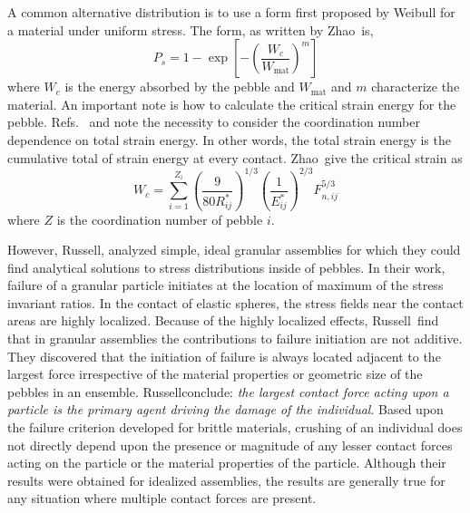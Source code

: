 A common alternative distribution is to use a form first proposed by Weibull for a material under uniform stress\cite{Kwok2013,Zhao2011,nakata1999probabilistic,Zhao2013,Pitchumani2004}. The form, as written by Zhao\etal~is,
\begin{equation}
	P_s = 1 - \exp\left[-\left(\frac{W_c}{W_\text{mat}}\right)^m\right]
\end{equation}
where $W_c$ is the energy absorbed by the pebble and $W_\text{mat}$ and $m$ characterize the material. An important note is how to calculate the critical strain energy for the pebble. Refs.~\cite{Marketos2007} and \cite{Zhao2011} note the necessity to consider the coordination number dependence on total strain energy. In other words, the total strain energy is the cumulative total of strain energy at every contact. Zhao\etal~give the critical strain as
\begin{equation}
	W_c = \sum_{i=1}^{Z_i}\left(\frac{9}{80 R_{ij}^*}\right)^{1/3} \left(\frac{1}{E_{ij}^*}\right)^{2/3} F_{n,ij}^{5/3}
\end{equation}
where $Z$ is the coordination number of pebble $i$. 

However, Russell\etal, analyzed simple, ideal granular assemblies for which they could find analytical solutions to stress distributions inside of pebbles.\cite{Russell2009} In their work, failure of a granular particle initiates at the location of maximum of the stress invariant ratios. In the contact of elastic spheres, the stress fields near the contact areas are highly localized. Because of the highly localized effects, Russell\etal~find that in granular assemblies the contributions to failure initiation are not additive. They discovered that the initiation of failure is always located adjacent to the largest force irrespective of the material properties or geometric size of the pebbles in an ensemble. Russell\etal conclude: \emph{the largest contact force acting upon a particle is the primary agent driving the damage of the individual}.\cite{Russell2009} Based upon the failure criterion developed for brittle materials, crushing of an individual does not directly depend upon the presence or magnitude of any lesser contact forces acting on the particle or the material properties of the particle. Although their results were obtained for idealized assemblies, the results are generally true for any situation where multiple contact forces are present.

